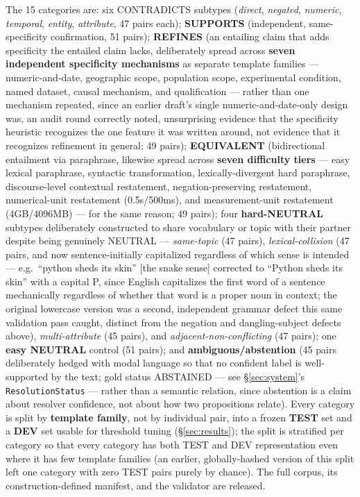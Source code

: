 The 15 categories are: six CONTRADICTS subtypes (\emph{direct},
\emph{negated}, \emph{numeric}, \emph{temporal}, \emph{entity},
\emph{attribute}, 47 pairs each); \textbf{SUPPORTS} (independent,
same-specificity confirmation, 51 pairs); \textbf{REFINES} (an entailing
claim that adds specificity the entailed claim lacks, deliberately spread
across \textbf{seven independent specificity mechanisms} as separate
template families --- numeric-and-date, geographic scope, population
scope, experimental condition, named dataset, causal mechanism, and
qualification --- rather than one mechanism repeated, since an earlier
draft's single numeric-and-date-only design was, an audit round
correctly noted, unsurprising evidence that the specificity heuristic
recognizes the one feature it was written around, not evidence that it
recognizes refinement in general; 49 pairs); \textbf{EQUIVALENT}
(bidirectional entailment via paraphrase, likewise spread across
\textbf{seven difficulty tiers} --- easy lexical paraphrase, syntactic
transformation, lexically-divergent hard paraphrase, discourse-level
contextual restatement, negation-preserving restatement, numerical-unit
restatement (0.5s/500ms), and measurement-unit restatement (4GB/4096MB)
--- for the same reason; 49 pairs); four \textbf{hard-NEUTRAL} subtypes
deliberately constructed to share vocabulary or topic with their partner
despite being genuinely NEUTRAL --- \emph{same-topic} (47 pairs),
\emph{lexical-collision} (47 pairs, and now sentence-initially
capitalized regardless of which sense is intended --- e.g.\ ``python
sheds its skin'' [the snake sense] corrected to ``Python sheds its skin''
with a capital P, since English capitalizes the first word of a sentence
mechanically regardless of whether that word is a proper noun in
context; the original lowercase version was a second, independent
grammar defect this same validation pass caught, distinct from the
negation and dangling-subject defects above),
\emph{multi-attribute} (45 pairs), and \emph{adjacent-non-conflicting}
(47 pairs); one \textbf{easy NEUTRAL} control (51 pairs); and
\textbf{ambiguous/abstention} (45 pairs deliberately hedged with modal
language so that no confident label is well-supported by the text; gold
status ABSTAINED --- see \S\ref{sec:system}'s \texttt{ResolutionStatus}
--- rather than a semantic relation, since abstention is a claim about
resolver confidence, not about how two propositions relate). Every
category is split by \textbf{template family}, not by individual pair,
into a frozen \textbf{TEST} set and a \textbf{DEV} set usable for
threshold tuning (\S\ref{sec:results}); the split is stratified per
category so that every category has both TEST and DEV representation
even where it has few template families (an earlier, globally-hashed
version of this split left one category with zero TEST pairs purely by
chance). The full corpus, its construction-defined manifest, and the
validator are released.

